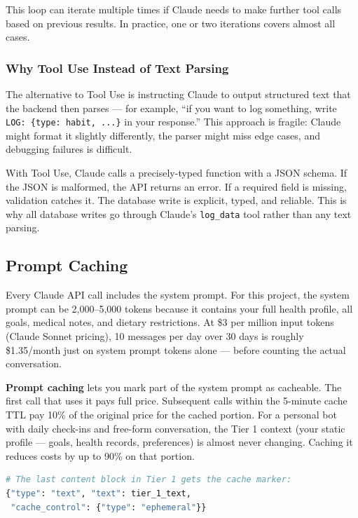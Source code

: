 \documentclass[12pt, a4paper]{article}
\begin{document}
This loop can iterate multiple times if Claude needs to make further tool calls based on previous results. In practice, one or two iterations covers almost all cases.

\subsubsection{Why Tool Use Instead of Text Parsing}

The alternative to Tool Use is instructing Claude to output structured text that the backend then parses --- for example, ``if you want to log something, write \texttt{LOG: \{type: habit, ...\}} in your response.'' This approach is fragile: Claude might format it slightly differently, the parser might miss edge cases, and debugging failures is difficult.

With Tool Use, Claude calls a precisely-typed function with a JSON schema. If the JSON is malformed, the API returns an error. If a required field is missing, validation catches it. The database write is explicit, typed, and reliable. This is why all database writes go through Claude's \texttt{log\_data} tool rather than any text parsing.

\subsection{Prompt Caching}

Every Claude API call includes the system prompt. For this project, the system prompt can be 2,000--5,000 tokens because it contains your full health profile, all goals, medical notes, and dietary restrictions. At \$3 per million input tokens (Claude Sonnet pricing), 10 messages per day over 30 days is roughly \$1.35/month just on system prompt tokens alone --- before counting the actual conversation.

\textbf{Prompt caching} lets you mark part of the system prompt as cacheable. The first call that uses it pays full price. Subsequent calls within the 5-minute cache TTL pay 10\% of the original price for the cached portion. For a personal bot with daily check-ins and free-form conversation, the Tier 1 context (your static profile --- goals, health records, preferences) is almost never changing. Caching it reduces costs by up to 90\% on that portion.

\begin{lstlisting}[language=Python]
# The last content block in Tier 1 gets the cache marker:
{"type": "text", "text": tier_1_text,
 "cache_control": {"type": "ephemeral"}}
\end{lstlisting}
\end{document}
